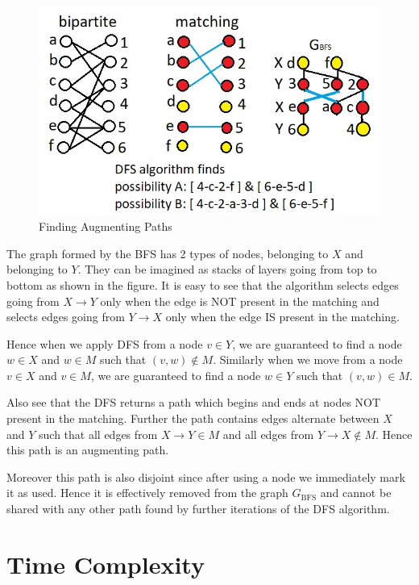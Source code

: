 \documentclass{article}
\begin{document}
\begin{figure}[!h]
    \centering
    \includegraphics[scale=0.7]{hopcroftkarp_bfs.jpg}
    \caption{Finding Augmenting Paths}
\end{figure}

The graph formed by the BFS has 2 types of nodes, belonging to $X$ and belonging to $Y$. They can be imagined as stacks of layers going from top to bottom as shown in the figure. It is easy to see that the algorithm selects edges going from $X \to Y$ only when the edge is NOT present in the matching and selects edges going from $Y \to X$ only when the edge IS present in the matching.

Hence when we apply DFS from a node $v \in Y$, we are guaranteed to find a node $w \in X$ and $w \in M$ such that $(v, w) \notin M$. Similarly when we move from a node $v \in X $ and $v \in M$, we are guaranteed to find a node $w \in Y$ such that $(v, w) \in M$.

Also see that the DFS returns a path which begins and ends at nodes NOT present in the matching. Further the path contains edges alternate between $X$ and $Y$ such that all edges from $X \to Y \in M$ and all edges from $Y \to X \notin M$. Hence this path is an augmenting path.

Moreover this path is also disjoint since after using a node we immediately mark it as used. Hence it is effectively removed from the graph $G_{\mathrm{BFS}}$ and cannot be shared with any other path found by further iterations of the DFS algorithm.

\section{Time Complexity}
\end{document}
